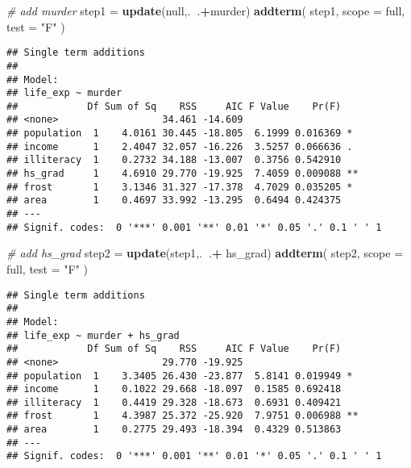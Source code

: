 \documentclass[]{article}
\newenvironment{Shaded}{\begin{snugshade}}{\end{snugshade}}
\newcommand{\CommentTok}[1]{\textcolor[rgb]{0.56,0.35,0.01}{\textit{#1}}}
\newcommand{\DataTypeTok}[1]{\textcolor[rgb]{0.13,0.29,0.53}{#1}}
\newcommand{\KeywordTok}[1]{\textcolor[rgb]{0.13,0.29,0.53}{\textbf{#1}}}
\newcommand{\NormalTok}[1]{#1}
\newcommand{\OperatorTok}[1]{\textcolor[rgb]{0.81,0.36,0.00}{\textbf{#1}}}
\newcommand{\StringTok}[1]{\textcolor[rgb]{0.31,0.60,0.02}{#1}}
\begin{document}
\begin{Shaded}
\begin{Highlighting}[]
\CommentTok{# add murder}
\NormalTok{step1 =}\StringTok{ }\KeywordTok{update}\NormalTok{(null,.}\OperatorTok{~}\NormalTok{.}\OperatorTok{+}\NormalTok{murder) }
\KeywordTok{addterm}\NormalTok{( step1, }\DataTypeTok{scope =}\NormalTok{ full, }\DataTypeTok{test =} \StringTok{"F"}\NormalTok{ )}
\end{Highlighting}
\end{Shaded}

\begin{verbatim}
## Single term additions
## 
## Model:
## life_exp ~ murder
##            Df Sum of Sq    RSS     AIC F Value    Pr(F)   
## <none>                  34.461 -14.609                    
## population  1    4.0161 30.445 -18.805  6.1999 0.016369 * 
## income      1    2.4047 32.057 -16.226  3.5257 0.066636 . 
## illiteracy  1    0.2732 34.188 -13.007  0.3756 0.542910   
## hs_grad     1    4.6910 29.770 -19.925  7.4059 0.009088 **
## frost       1    3.1346 31.327 -17.378  4.7029 0.035205 * 
## area        1    0.4697 33.992 -13.295  0.6494 0.424375   
## ---
## Signif. codes:  0 '***' 0.001 '**' 0.01 '*' 0.05 '.' 0.1 ' ' 1
\end{verbatim}

\begin{Shaded}
\begin{Highlighting}[]
\CommentTok{# add hs_grad }
\NormalTok{step2 =}\StringTok{ }\KeywordTok{update}\NormalTok{(step1,.}\OperatorTok{~}\NormalTok{.}\OperatorTok{+}\StringTok{ }\NormalTok{hs_grad) }
\KeywordTok{addterm}\NormalTok{( step2, }\DataTypeTok{scope =}\NormalTok{ full, }\DataTypeTok{test =} \StringTok{"F"}\NormalTok{ )}
\end{Highlighting}
\end{Shaded}

\begin{verbatim}
## Single term additions
## 
## Model:
## life_exp ~ murder + hs_grad
##            Df Sum of Sq    RSS     AIC F Value    Pr(F)   
## <none>                  29.770 -19.925                    
## population  1    3.3405 26.430 -23.877  5.8141 0.019949 * 
## income      1    0.1022 29.668 -18.097  0.1585 0.692418   
## illiteracy  1    0.4419 29.328 -18.673  0.6931 0.409421   
## frost       1    4.3987 25.372 -25.920  7.9751 0.006988 **
## area        1    0.2775 29.493 -18.394  0.4329 0.513863   
## ---
## Signif. codes:  0 '***' 0.001 '**' 0.01 '*' 0.05 '.' 0.1 ' ' 1
\end{verbatim}
\end{document}
